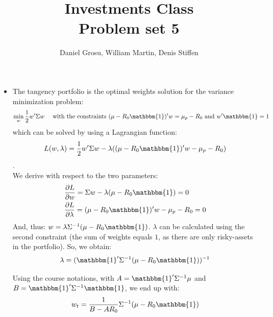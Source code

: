 \documentclass[10pt]{article}
\newenvironment{exercise}[2][Exercise]{\begin{trivlist}
  \item[\hskip \labelsep {\bfseries #1}\hskip \labelsep {\bfseries #2.}]}{\end{trivlist}}
\begin{document}
	
  \renewcommand{\qedsymbol}{\smiley}
	\title{Investments Class \\ Problem set 5}
	\author{Daniel Grosu, William Martin, Denis Stiffen}
		
\maketitle

\begin{exercise}{1}
  \begin{itemize}
    \item The tangency portfolio is the optimal weights solution for the variance minimization problem:
    $$ \min_w{\frac{1}{2}w'\Sigma w} \quad \text{ with the constraints } (\mu-R_0\mathbbm{1})'w = \mu_p-R_0 \text{ and } w'\mathbbm{1} = 1$$ which can be solved by using a Lagrangian function: $$L(w,\lambda) =  \frac{1}{2}w'\Sigma w - \lambda((\mu-R_0\mathbbm{1})'w - \mu_p-R_0)$$. 
    \\
    We derive with respect to the two parameters:
    \begin{align*}
      &\frac{\partial L}{\partial w} = \Sigma w -\lambda (\mu-R_0\mathbbm{1}) = 0 \\
      &\frac{\partial L}{\partial \lambda} = (\mu-R_0\mathbbm{1})'w - \mu_p-R_0 = 0 
    \end{align*}
    And, thus: $w = \lambda\Sigma^{-1}(\mu-R_0\mathbbm{1})$. $\lambda$ can be calculated using the second constraint (the sum of weights equals $1$, as there are only risky-assets in the portfolio). So, we obtain:
    $$ \lambda = (\mathbbm{1}'\Sigma^{-1}(\mu-R_0\mathbbm{1}))^{-1}$$
    
    Using the course notations, with $A = \mathbbm{1}'\Sigma^{-1}\mu$ and $B=\mathbbm{1}'\Sigma^{-1}\mathbbm{1}$, we end up with:
    $$ w_t = \frac{1}{B-AR_0}\Sigma^{-1}(\mu-R_0\mathbbm{1})$$
    

\end{itemize}
\end{exercise}
\end{document}
